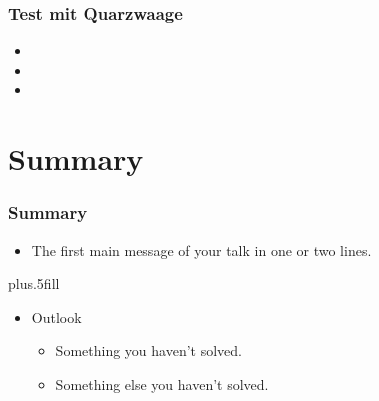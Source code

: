 \documentclass{beamer}
\begin{document}
\begin{frame}
\frametitle{Test mit Quarzwaage}
\begin{itemize}\setlength{\itemsep}{+15pt}
  \item 
  \item 
  \item 
\end{itemize}
\end{frame}




\section*{Summary}

\begin{frame}
\frametitle<presentation>{Summary}

\begin{itemize}
  \item The \alert{first main message} of your talk in one or two lines.
\end{itemize}




\vskip0pt plus.5fill
\begin{itemize}
  \item Outlook
  \begin{itemize}
    \item Something you haven't solved.
    \item Something else you haven't solved.
  \end{itemize}
\end{itemize}
\end{frame}
\end{document}
